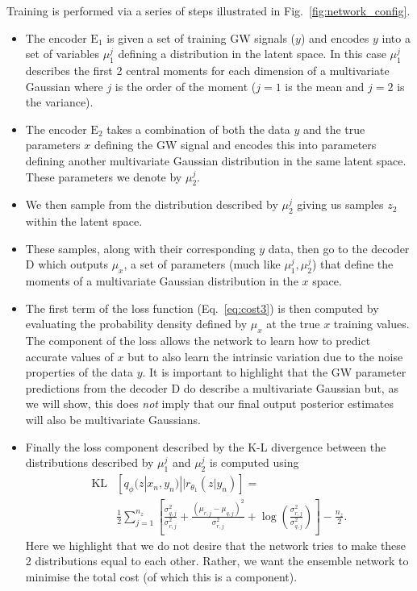 \documentclass[%
showpacs,
 amsmath,amssymb,
 aps,
 twocolumn,
 prl,
 reprint,
floatfix,
]{revtex4-1}
\begin{document}
%
%
Training is performed via a series of steps illustrated in
Fig.~\ref{fig:network_config}.
%
\begin{itemize}
%
\item The encoder $\textrm{E}_1$ is given a set of training \ac{GW} signals
($y$) and encodes $y$ into a set of variables $\mu^{j}_{1}$ defining a
distribution in the latent space. In this case $\mu^{j}_{1}$ describes the
first 2 central moments for each dimension of a multivariate Gaussian where $j$
is the order of the moment ($j=1$ is the mean and $j=2$ is the variance).
%
\item The encoder $\textrm{E}_2$ takes a combination of both the data $y$ and
the true parameters $x$ defining the \ac{GW} signal and encodes this into
parameters defining another multivariate Gaussian distribution in the same
latent space. These parameters we denote by $\mu^{j}_{2}$.
%
\item We then sample from the distribution described by $\mu^{j}_{2}$
giving us samples $z_{2}$ within the latent space.
%
\item These samples, along with their corresponding $y$ data, then go to the
decoder D which outputs $\mu_{x}$, a set of parameters (much like
$\mu^{j}_{1},\mu^{j}_{2}$) that define the moments of a multivariate Gaussian
distribution in the $x$ space.
\item The first term of the loss function (Eq.~\ref{eq:cost3}) is then computed
by evaluating the probability density defined by $\mu_x$ at the true $x$
training values. The component of the loss allows the network to learn how to
predict accurate values of $x$ but to also learn the intrinsic variation due to
the noise properties of the data $y$. It is important to highlight that the
\ac{GW} parameter predictions from the decoder D do describe a multivariate
Gaussian but, as we will show, this does \emph{not} imply that our final output
posterior estimates will also be multivariate Gaussians.
%
\item Finally the loss component described by the K-L divergence between the
distributions described by $\mu^{j}_1$ and $\mu^{j}_2$ is computed using
%
\begin{align}\label{eq:klgauss}
\text{KL}&\left[q_{\phi}(z|x_{n},y_{n})||r_{\theta_{1}}(z|y_{n})\right] = \\
&\frac{1}{2}\sum_{j=1}^{n_{z}}\left[\frac{\sigma_{q,j}^{2}}{\sigma_{r,j}^{2}} +
\frac{(\mu_{r,j}-\mu_{q,j})^{2}}{\sigma_{r,j}^{2}}+
\log\left(\frac{\sigma_{r,j}^{2}}{\sigma_{q,j}^{2}}\right)\right] -
\frac{n_{z}}{2}.\nonumber \end{align}
%
Here we highlight that we do not desire that the network tries to make these 2
distributions equal to each other. Rather, we want the ensemble network to
minimise the total cost (of which this is a component).
%
\end{itemize}
\end{document}
